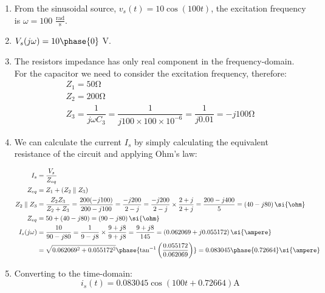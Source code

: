 \documentclass[10pt,a4paper]{memoir}
\begin{document}
\begin{solution}
  \begin{enumerate}
    \item From the sinusoidal source, $v_s(t)=10\cos{\left(100t\right)}$, the excitation frequency is $\omega=100$ $\frac{\mbox{rad}}{\mbox{s}}$.
    \item $V_s(j\omega)=10\phase{0}$ \si{\volt}.
    \item The resistors impedance has only real component in the frequency-domain. For the capacitor we need to consider the excitation frequency, therefore:
    \begin{gather*}
      Z_1 = 50 \si{\ohm}\\
      Z_2 = 200 \si{\ohm}\\
      Z_3 = \dfrac{1}{j\omega C_3} = \dfrac{1}{j 100\times100\times10^{-6}} = \dfrac{1}{j0.01} = -j100\si{\ohm}
    \end{gather*}
    \item We can calculate the current $I_s$ by simply calculating the equivalent resistance of the circuit and applying Ohm's law:
    \begin{figure}[!h]
      \centering
      \qquad
  \end{figure}
  \begin{align*}
    I_s &= \dfrac{V_s}{Z_{eq}} \\
    Z_{eq} &= Z_1 + \left( Z_2  \parallel Z_3 \right) \\
    Z_2\parallel Z_3 &= \dfrac{Z_2 Z_3}{Z_2+Z_3} = \dfrac{200(-j100)}{200 - j100} = \dfrac{-j200}{2 - j} = \dfrac{-j200}{2 - j}\times\dfrac{2 + j}{2 + j} = \dfrac{200-j400}{5} = \left( 40 - j80 \right)\si{\ohm} \\
    Z_{eq} &= 50 + \left( 40 - j80 \right) = \left( 90 - j80 \right)\si{\ohm} \\
    I_s(j\omega) &= \dfrac{10}{90 - j80} = \dfrac{1}{9 - j8}\times\dfrac{9 + j8}{9 + j8} = \dfrac{9 + j8}{145} = \left( 0.062069 + j0.055172 \right)\si{\ampere} \\
    &= \sqrt{0.062069^2 + 0.055172^2}\phase{\tan^{-1}\left(\frac{0.055172}{0.062069}\right)} = 0.083045\phase{0.72664}\si{\ampere}
  \end{align*}
  \item Converting to the time-domain:
  \begin{equation*}
    i_s(t) = 0.083045\cos{\left(100t + 0.72664\right)} \si{\ampere} 
  \end{equation*}
  \end{enumerate}
\end{solution}
\end{document}
